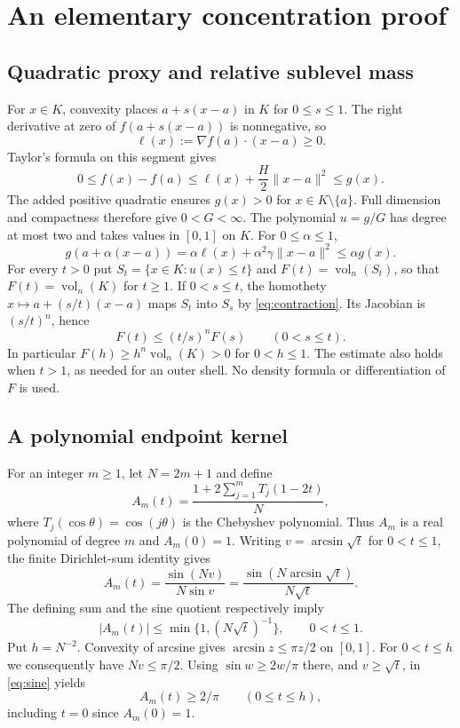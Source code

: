 \documentclass[11pt]{article}
\newcommand{\vol}{\operatorname{vol}_n}
\begin{document}
\section{An elementary concentration proof}

\subsection*{Quadratic proxy and relative sublevel mass}
For $x\in K$, convexity places $a+s(x-a)$ in $K$ for $0\le s\le1$.
The right derivative at zero of $f(a+s(x-a))$ is nonnegative, so
\[
 \ell(x):=\nabla f(a)\cdot(x-a)\ge0.
\]
Taylor's formula on this segment gives
\[
 0\le f(x)-f(a)
 \le \ell(x)+\frac H2\|x-a\|^2\le g(x).
\]
The added positive quadratic ensures $g(x)>0$ for $x\in K\setminus\{a\}$.
Full dimension and compactness therefore give $0<G<\infty$.
The polynomial $u=g/G$ has degree at most two and takes values in
$[0,1]$ on $K$. For $0\le\alpha\le1$,
\begin{equation}\label{eq:contraction}
 g(a+\alpha(x-a))
   =\alpha\ell(x)+\alpha^2\gamma\|x-a\|^2
   \le\alpha g(x).
\end{equation}
For every $t>0$ put
$S_t=\{x\in K:u(x)\le t\}$ and $F(t)=\vol(S_t)$, so that
$F(t)=\vol(K)$ for $t\ge1$.
If $0<s\le t$, the homothety
$x\mapsto a+(s/t)(x-a)$ maps $S_t$ into $S_s$ by
\eqref{eq:contraction}. Its Jacobian is $(s/t)^n$, hence
\begin{equation}\label{eq:growth}
 F(t)\le(t/s)^n F(s)\qquad(0<s\le t).
\end{equation}
In particular $F(h)\ge h^n\vol(K)>0$ for $0<h\le1$.
The estimate also holds when $t>1$, as needed for an outer shell.
No density formula or differentiation of $F$ is used.

\subsection*{A polynomial endpoint kernel}
For an integer $m\ge1$, let $N=2m+1$ and define
\begin{equation}\label{eq:kernel}
 A_m(t)=\frac{1+2\sum_{j=1}^m T_j(1-2t)}{N},
\end{equation}
where $T_j(\cos\theta)=\cos(j\theta)$ is the Chebyshev polynomial.
Thus $A_m$ is a real polynomial of degree $m$ and $A_m(0)=1$.
Writing $v=\arcsin\sqrt t$ for $0<t\le1$, the finite Dirichlet-sum
identity gives
\begin{equation}\label{eq:sine}
 A_m(t)=\frac{\sin(Nv)}{N\sin v}
        =\frac{\sin(N\arcsin\sqrt t)}{N\sqrt t}.
\end{equation}
The defining sum and the sine quotient respectively imply
\begin{equation}\label{eq:envelope}
 |A_m(t)|\le\min\{1,(N\sqrt t)^{-1}\},\qquad 0<t\le1.
\end{equation}
Put $h=N^{-2}$. Convexity of arcsine gives
$\arcsin z\le\pi z/2$ on $[0,1]$.
For $0<t\le h$ we consequently have $Nv\le\pi/2$.
Using $\sin w\ge2w/\pi$ there, and $v\ge\sqrt t$, in
\eqref{eq:sine} yields
\begin{equation}\label{eq:core}
 A_m(t)\ge 2/\pi\qquad(0\le t\le h),
\end{equation}
including $t=0$ since $A_m(0)=1$.
\end{document}
